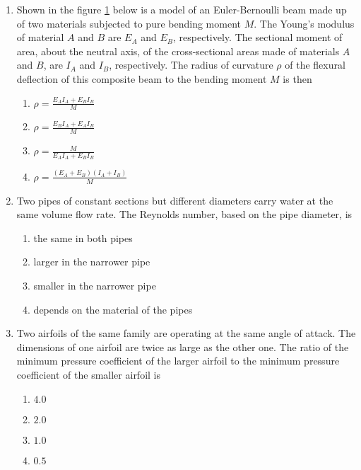 \documentclass[journal]{IEEEtran}
\begin{document}
\begin{enumerate}
	\item Shown in the figure \ref{25} below is a model of an Euler-Bernoulli beam made up of two materials subjected to pure bending moment $M$. The Young's modulus of material $A$ and $B$ are $E_A$ and $E_B$, respectively. The sectional moment of area, about the neutral axis, of the cross-sectional areas made of materials $A$ and $B$, are $I_A$ and $I_B$, respectively. The radius of curvature $\rho$ of the flexural deflection of this composite beam to the bending moment $M$ is then

		\begin{figure}[H]
			\centering
			
			\caption{}
			\label{25}
		\end{figure}


		\begin{enumerate}
    			\item $ \rho = \frac{E_A I_A + E_B I_B}{M} $
   			\item $ \rho = \frac{E_B I_A + E_A I_B}{M} $
  			\item $ \rho = \frac{M}{E_A I_A + E_B I_B} $
  			\item $ \rho = \frac{(E_A + E_B)(I_A + I_B)}{M} $
		\end{enumerate}


	\item Two pipes of constant sections but different diameters carry water at the same volume flow rate. The Reynolds number, based on the pipe diameter, is
		\begin{enumerate}
    			\item the same in both pipes
    			\item larger in the narrower pipe
    			\item smaller in the narrower pipe
    			\item depends on the material of the pipes
		\end{enumerate}

	\item 	Two airfoils of the same family are operating at the same angle of attack. The dimensions of one airfoil are twice as large as the other one. The ratio of the minimum pressure coefficient of the larger airfoil to the minimum pressure coefficient of the smaller airfoil is
		\begin{enumerate}
			\item $4.0$
    			\item $2.0$
    			\item $1.0$
    			\item $0.5$
		\end{enumerate}



\end{enumerate}
\end{document}
